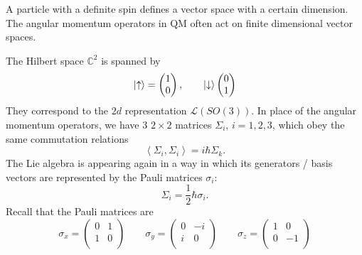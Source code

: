 
A particle with a definite spin defines a vector space with a certain dimension.
The angular momentum operators in QM often act on finite dimensional vector spaces.
\begin{example}[$\mathbb{C}^2$]
The Hilbert space $\mathbb{C}^2$ is spanned by
\begin{equation}
  \ket{\uparrow} =
  \begin{pmatrix}
  1 \\
  0 \\
  \end{pmatrix},
  \qquad
  \ket{\downarrow}
  \begin{pmatrix}
  0 \\
  1 \\
  \end{pmatrix}
\end{equation}
  They correspond to the $2d$ representation $\mathscr{L}(SO(3))$. In place of the angular momentum operators, we have 3 $2\times 2$ matrices $\Sigma_i$, $i = 1,2,3$, which obey the same commutation relations
  \begin{equation}
    \left\langle \Sigma_i , \Sigma_i \right\rangle = i \hbar \Sigma_k.
  \end{equation}
  The Lie algebra is appearing again in a way in which its generators / basis vectors are represented by the Pauli matrices $\sigma_i$:
  \begin{equation}
    \Sigma_i = \frac{1}{2} \hbar \sigma_i.
  \end{equation}
  Recall that the Pauli matrices are
  \begin{equation}
    \sigma_x = 
    \begin{pmatrix}
     0 & 1 \\
     1 & 0 \\
    \end{pmatrix}
    \qquad
    \sigma_y = 
    \begin{pmatrix}
     0 & -i \\
     i & 0 \\
    \end{pmatrix}
    \qquad
    \sigma_z = 
    \begin{pmatrix}
     1 & 0 \\
     0 & -1 \\
    \end{pmatrix}
  \end{equation}
\end{example}

